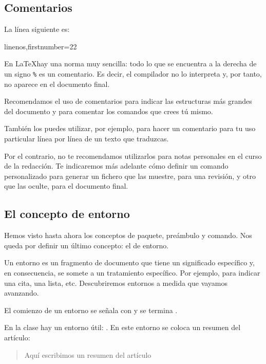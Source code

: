 \subsection{Comentarios}

La línea siguiente es: 
\begin{latexcode*}{linenos,firstnumber=22}
\end{latexcode*}

En \LaTeX hay una norma muy sencilla: todo lo que se encuentra a la derecha de un signo \verb|%| es un comentario.
Es decir, el compilador no lo interpreta y, por tanto, no aparece en el documento final. 

Recomendamos el uso de comentarios para indicar las estructuras más grandes del documento y para comentar los comandos que crees tú mismo. 

También los puedes utilizar, por ejemplo, para hacer un comentario para tu uso particular línea por línea de un texto que traduzcas.

Por el contrario, no te recomendamos utilizarlos para notas personales en el curso de la redacción. Te indicaremos más adelante cómo definir un comando personalizado para generar un fichero que las muestre, para una revisión, y otro que las oculte, para el documento final.



\subsection{El concepto de entorno}

Hemos visto hasta ahora los conceptos de paquete, preámbulo y comando. Nos queda por definir un último concepto: el de entorno.

Un entorno es un fragmento de documento que tiene un significado específico y, en consecuencia, se somete a un tratamiento específico. Por ejemplo, para indicar una cita, una lista, etc. Descubriremos entornos a medida que vayamos avanzando. 


El comienzo de un entorno se señala   con  y se termina .

En la clase  hay un entorno útil: . En este entorno se coloca un resumen del artículo:

\begin{latexcode}
\begin{abstract}
Aquí escribimos un resumen del artículo 
\end{abstract}
\end{latexcode}


